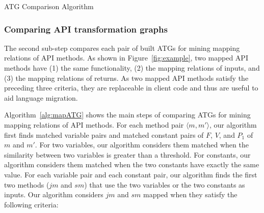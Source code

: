 \begin{algorithm}[t]
\begin{SmallOut}
\label{alg:mapATG} \dontprintsemicolon
 \end{SmallOut}
\caption{ATG Comparison Algorithm}
\end{algorithm}

\subsubsection{Comparing API transformation graphs} The
second sub-step compares each pair of built ATGs for mining mapping
relations of API methods. As shown in Figure~\ref{fig:example}, two
mapped API methods have (1) the same functionality, (2) the mapping
relations of inputs, and (3) the mapping relations of returns. As
two mapped API methods satisfy the preceding three criteria, they
are replaceable in client code and thus are useful to aid language
migration.

Algorithm~\ref{alg:mapATG} shows the main steps of comparing ATGs
for mining mapping relations of API methods. For each method pair
$\langle m, m'\rangle$, our algorithm first finds matched variable
pairs and matched constant pairs of $F$, $V$, and $P_1$ of $m$ and
$m'$. For two variables, our algorithm considers them matched when
the similarity between two variables is greater than a threshold.
For constants, our algorithm considers them matched when the two
constants have exactly the same value. For each variable pair and
each constant pair, our algorithm finds the first two methods ($jm$
and $sm$) that use the two variables or the two constants as inputs.
Our algorithm considers $jm$ and $sm$ mapped when they satisfy the
following criteria:

